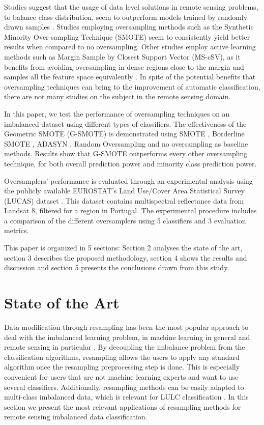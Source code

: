 \documentclass[parskip=full]{scrartcl}
\begin{document}
Studies suggest that the usage of data level solutions in remote sensing
problems, to balance class distribution, seem to outperform models trained by
randomly drawn samples \cite{Wang2019, Mellor2015}.  Studies employing
oversampling methods such as the Synthetic Minority Over-sampling Technique
(SMOTE) \cite{Chawla2002} seem to consistently yield better results
\cite{Johnson2013, Geib2015} when compared to no oversampling. Other studies
employ active learning methods such as Margin Sample by Closest Support Vector
(MS-cSV), as it benefits from avoiding oversampling in dense regions close to
the margin and samples all the feature space equivalently \cite{Tuia2009}. In
spite of the potential benefits that oversampling techniques can bring to the
improvement of automatic classification, there are not many studies on the
subject in the remote sensing domain.

In this paper, we test the performance of oversampling techniques on an
imbalanced dataset using different types of classifiers. The effectiveness of
the Geometric SMOTE (G-SMOTE) \cite{Douzas2019} is demonstrated using SMOTE
\cite{Chawla2002}, Borderline SMOTE \cite{Han2005}, ADASYN \cite{HaiboHe2008},
Random Oversampling and no oversampling as baseline methods. Results show that
G-SMOTE outperforms every other oversampling technique, for both overall
prediction power and minority class prediction power.

Oversamplers' performance is evaluated through an experimental analysis using
the publicly available EUROSTAT's Land Use/Cover Area Statistical Survey (LUCAS)
dataset \cite{LUCAS2015}. This dataset contains multispectral reflectance data
from Landsat 8, filtered for a region in Portugal. The experimental procedure
includes a comparison of the different oversamplers using 5 classifiers and 3
evaluation metrics.

This paper is organized in 5 sections: Section 2 analyses the state of the art,
section 3 describes the proposed methodology, section 4 shows the results and
discussion and section 5 presents the conclusions drawn from this study.

\section{State of the Art}

Data modification through resampling has been the most popular approach to deal
with the imbalanced learning problem, in machine learning in general
\cite{Douzas2019} and remote sensing in particular \cite{Feng2019}. By
decoupling the imbalance problem from the classification algorithms, resampling
allows the users to apply any standard algorithm once the resampling
preprocessing step is done. This is especially convenient for users that are not
machine learning experts and want to use several classifiers. Additionally,
resampling methods can be easily adapted to multi-class imbalanced data, which
is relevant for LULC classification \cite{Feng2019}. In this section we present
the most relevant applications of resampling methods for remote sensing
imbalanced data classification.
\end{document}
